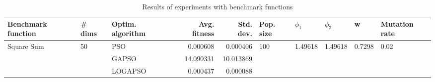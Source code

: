 \begin{table}
\centering
\caption{Results of experiments with benchmark functions}
\begin{tabular}{lllrrlllll}
\toprule
         Benchmark function &             \# dims & Optim. algorithm &  Avg. fitness &  Std. dev. &            Pop. size &               $\phi_{1}$ &               $\phi_{2}$ &                       w &         Mutation rate \\
\midrule
\multirow{3}{*}{Square Sum} & \multirow{3}{*}{50} &              PSO &      0.000608 &   0.000406 & \multirow{3}{*}{100} & \multirow{3}{*}{1.49618} & \multirow{3}{*}{1.49618} & \multirow{3}{*}{0.7298} & \multirow{3}{*}{0.02} \\
                            &                     &            GAPSO &     14.090331 &  10.013869 &                      &                          &                          &                         &                       \\
                            &                     &          LOGAPSO &      0.000437 &   0.000088 &                      &                          &                          &                         &                       \\
\bottomrule
\end{tabular}
\end{table}
